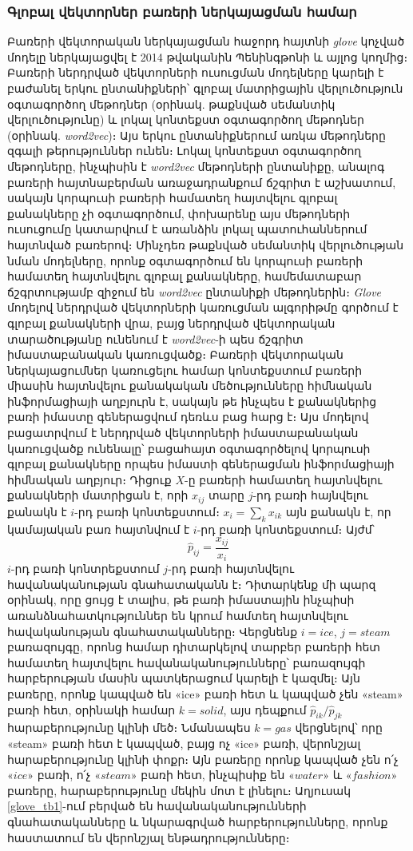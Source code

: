 \documentclass[11pt]{article}
\begin{document}
\pagebreak 

\subsubsection*{\hfill  Գլոբալ վեկտորներ բառերի ներկայացման համար \hfill} \noindent
{}
{}
\par Բառերի վեկտորական ներկայացման հաջորդ հայտնի  \textit{glove} կոչված մոդելը ներկայացվել է 2014 թվականին Պենինգթոնի \cite{bib_item_28} և այլոց կողմից։ Բառերի ներդրված վեկտորների ուսուցման մոդելները կարելի է բաժանել երկու ընտանիքների՝
գլոբալ մատրիցային վերլուծություն օգտագործող մեթոդներ (օրինակ. թաքնված սեմանտիկ վերլուծությունը) և լոկալ  կոնտեքստ օգտագործող մեթոդներ (օրինակ. \textit{word2vec})։ Այս երկու ընտանիքներում առկա մեթոդները զգալի թերություններ ունեն։ Լոկալ կոնտեքստ օգտագործող մեթոդները, ինչպիսին է \textit{word2vec} մեթոդների ընտանիքը, անալոգ բառերի հայտնաբերման առաջադրանքում ճշգրիտ է աշխատում, սակայն կորպուսի բառերի համատեղ հայտվելու գլոբալ քանակները  չի օգտագործում, փոխարենը այս մեթոդների ուսուցումը կատարվում է առանձին լոկալ պատուհաններում հայտնված բառերով։ Մինչդեռ թաքնված սեմանտիկ վերլուծության նման մոդելները, որոնք օգտագործում են կորպուսի բառերի համատեղ հայտնվելու գլոբալ քանակները, համեմատաբար ճշգրտությամբ զիջում են \textit{word2vec} ընտանիքի մեթոդներին։ \textit{Glove} մոդելով ներդրված վեկտորների կառուցման ալգորիթմը գործում է գլոբալ քանակների վրա, բայց ներդրված վեկտորական տարածությանը ունենում է \textit{word2vec}-ի պես ճշգրիտ  իմաստաբանական կառուցվածք։ Բառերի վեկտորական ներկայացումներ կառուցելու համար կոնտեքստում բառերի միասին հայտնվելու քանակական մեծությունները հիմնական ինֆորմացիայի աղբյուրն է, սակայն թե ինչպես է քանակներից բառի իմաստը գեներացվում դեռևս բաց հարց է։  Այս մոդելով բացատրվում է ներդրված վեկտորների իմաստաբանական կառուցվածք ունենալը՝ բացահայտ օգտագործելով կորպուսի գլոբալ  քանակները որպես իմաստի գեներացման ինֆորմացիայի հիմնական աղբյուր։ Դիցուք $X$-ը բառերի համատեղ հայտնվելու քանակների մատրիցան է, որի $x_{ij}$ տարը $j$-րդ բառի հայնվելու քանակն է $i$-րդ բառի կոնտեքստում։ $x_i = \sum_{k} {x_{ik}}$ այն քանակն է, որ կամայական բառ հայտնվում է $i$-րդ բառի կոնտեքստում։ Այժմ՝ $$\hat p_{ij} = \frac{x_{ij}}{x_i}$$ $i$-րդ բառի կոնտրեքստում  $j$-րդ բառի հայտնվելու հավանականության գնահատականն է։ Դիտարկենք մի պարզ օրինակ, որը ցույց է տալիս, թե բառի իմաստային  ինչպիսի առանձնահատկություններ են կրում համտեղ հայտնվելու հավականության գնահատականները։  Վերցնենք $i=ice$,  $j=steam$ բառազույգը, որոնց համար դիտարկելով տարբեր բառերի հետ համատեղ հայտվելու հավանականությունները՝ բառազույգի հարբերության մասին պատկերացում կարելի է կազմել։ Այն բառերը, որոնք կապված են «ice» բառի հետ և կապված չեն «steam» բառի հետ, օրինակի համար $k = solid$, այս դեպքում $\hat p_{ik}/ \hat  p_{jk}$ հարաբերությունը կլինի մեծ։  Նմանապես $k = gas$ վերցնելով՝ որը «steam» բառի հետ է կապված, բայց ոչ «ice» բառի, վերոնշյալ հարաբերությունը կլինի փոքր։ Այն բառերը որոնք կապված չեն ո՛չ $«ice»$ բառի, ո՛չ $«steam»$ բառի հետ, ինչպիսիք են $«water»$ և $«fashion»$ բառերը, հարաբերությունը մեկին մոտ է լինելու։ Աղյուսակ \ref{glove_tb1}-ում բերված են հավանականությունների գնահատականները և նկարագրված հարբերությունները, որոնք հաստատում են վերոնշյալ ենթադրությունները։
\end{document}
